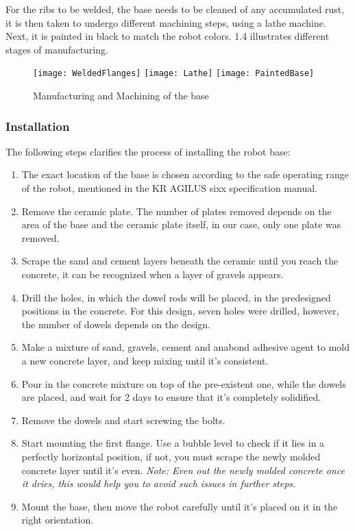 For the ribs to be welded, the base needs to be cleaned of any accumulated rust, it is then taken to undergo different machining steps, using a lathe machine. Next, it is painted in black to match the robot colors.
\newline \figurename{1.4} illustrates different stages of manufacturing.

\begin{figure}[H]
\begin{center}
	\texttt{[image: WeldedFlanges]}
	\texttt{[image: Lathe]}
	\texttt{[image: PaintedBase]}
	\caption{Manufacturing and Machining of the base}
\end{center}
\end{figure}

\subsubsection{Installation}

The following steps clarifies the process of installing the robot base:
\begin{enumerate}
	\item The exact location of the base is chosen according to the safe operating range of the robot, mentioned in the KR AGILUS sixx specification manual.
	\item Remove the ceramic plate. The number of plates removed depends on the area of the base and the ceramic plate itself, in our case, only one plate was removed.
	\item Scrape the sand and cement layers beneath the ceramic until you reach the concrete, it can be recognized when a layer of gravels appears.
	\item Drill the holes, in which the dowel rods will be placed, in the predesigned positions in the concrete. For this design, seven holes were drilled, however, the number of dowels depends on the design.
	\item Make a mixture of sand, gravels, cement and anabond adhesive agent to mold a new concrete layer, and keep mixing until it’s consistent.
	\item Pour in the concrete mixture on top of the pre-existent one, while the dowels are placed, and wait for 2 days to ensure that it’s completely solidified.
	\item Remove the dowels and start screwing the bolts.
    \item Start mounting the first flange. Use a bubble level to check if it lies in a perfectly horizontal position, if not, you must scrape the newly molded concrete layer until it’s even. 
	\textit{\newline Note: Even out the newly molded concrete once it dries, this would help you to avoid such issues in further steps.}
	\item Mount the base, then move the robot carefully until it’s placed on it in the right orientation.
\end{enumerate}


